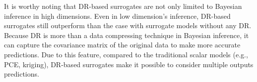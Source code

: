 It is worthy noting that DR-based surrogates are not only limited to Bayesian inference in high dimensions. Even in low dimension's inference, DR-based surrogates still outperform than the case with surrogate models without any \acrshort{DR}. Because \acrshort{DR} is more than a data compressing technique in Bayesian inference, it can capture the covariance matrix of the original data to make more accurate predictions. Due to this feature, compared to the traditional scalar models (e.g., PCE, kriging), DR-based surrogates make it possible to consider multiple outputs predictions.





